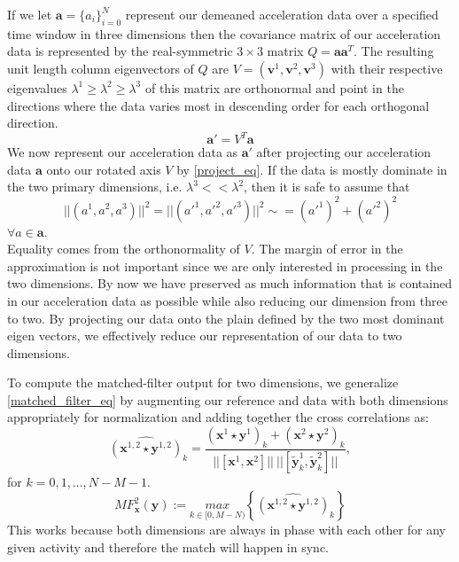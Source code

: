 \documentclass[journal]{IEEEtran}
\begin{document}
If we let $\textbf{a} = \{a_i\}_{i=0}^{N}$ represent our demeaned acceleration data over a specified time window in three dimensions then the covariance matrix of our acceleration data is represented by the real-symmetric $3 \times 3$ matrix $Q = \textbf{a} \textbf{a}^T$.
The resulting unit length column eigenvectors of $Q$ are $V = (\textbf{v}^1,\textbf{v}^2,\textbf{v}^3)$ with their respective eigenvalues $\lambda^1 \geq \lambda^2 \geq \lambda^3$ of this matrix are orthonormal and point in the directions where the data varies most in descending order for each orthogonal direction.
\begin{equation} \label{project_eq}
   \textbf{a}' = V^T \textbf{a}
\end{equation}
%
We now represent our acceleration data as $\textbf{a}'$ after projecting our acceleration data $\textbf{a}$ onto our rotated axis $V$ by \eqref{project_eq}. If the data is mostly dominate in the two primary dimensions, i.e. $\lambda^3 << \lambda^2$, then it is safe to assume that
%
\begin{equation} \label{magnitude_eq}
||(a^1,a^2,a^3)||^2 = ||(a'^1,a'^2,a'^3)||^2 \sim = (a'^1)^2 + (a'^2)^2
\end{equation}
$ \forall a \in \textbf{a}. $ \\
%
Equality comes from the orthonormality of $V$. The margin of error in the approximation is not important since we are only interested in processing in the two dimensions.
By now we have preserved as much information that is contained in our acceleration data as possible while also reducing our dimension from three to two.
By projecting our data onto the plain defined by the two most dominant eigen vectors, we effectively reduce our representation of our data to two dimensions.

To compute the matched-filter output for two dimensions, we generalize \eqref{matched_filter_eq} by augmenting our reference and data with both dimensions appropriately for normalization and adding together the cross correlations as:
%
\begin{equation} \label{cross_correlation_eq_2}
\widehat{(\textbf{x}^{1,2} \star \textbf{y}^{1,2})}_k = \frac{(\textbf{x}^1 \star \textbf{y}^1)_k + (\textbf{x}^2 \star \textbf{y}^2)_k}{||[ \textbf{x}^1, \textbf{x}^2 ]|| \ || [ \widetilde{\textbf{y}}_k^1, \widetilde{\textbf{y}}_k^2 ] || },
\end{equation}
%
for $ k = 0,1,...,N-M-1 $. \\
%
\begin{equation} \label{matched_filter_eq_2}
MF_{\textbf{x}}^2(\textbf{y}) := \underset{k \in [0, M-N)}{max} \left \{\widehat{(\textbf{x}^{1,2} \star \textbf{y}^{1,2})}_k \right \}
\end{equation}
%
This works because both dimensions are always in phase with each other for any given activity and therefore the match will happen in sync.
%
\end{document}
